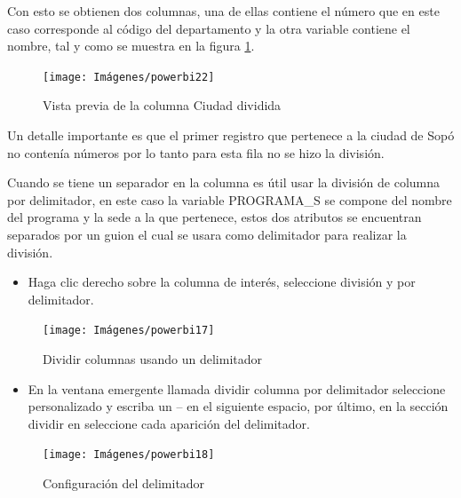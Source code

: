 \documentclass[
]{book}
\providecommand{\tightlist}{%
  \setlength{\itemsep}{0pt}\setlength{\parskip}{0pt}}
\begin{document}
Con esto se obtienen dos columnas, una de ellas contiene el número que en este caso corresponde al código del departamento y la otra variable contiene el nombre, tal y como se muestra en la figura \ref{fig:columnasdivididas-fig}.

\begin{figure}

{\centering \texttt{[image: Imágenes/powerbi22]} 

}

\caption{Vista previa de la columna Ciudad dividida}\label{fig:columnasdivididas-fig}
\end{figure}

Un detalle importante es que el primer registro que pertenece a la ciudad de Sopó no contenía números por lo tanto para esta fila no se hizo la división.

Cuando se tiene un separador en la columna es útil usar la división de columna por delimitador, en este caso la variable PROGRAMA\_S se compone del nombre del programa y la sede a la que pertenece, estos dos atributos se encuentran separados por un guion el cual se usara como delimitador para realizar la división.

\begin{itemize}
\tightlist
\item
  Haga clic derecho sobre la columna de interés, seleccione división y por delimitador.
\end{itemize}

\begin{figure}

{\centering \texttt{[image: Imágenes/powerbi17]} 

}

\caption{Dividir columnas usando un delimitador}\label{fig:columnasdivididasdelimitador-fig}
\end{figure}

\begin{itemize}
\tightlist
\item
  En la ventana emergente llamada dividir columna por delimitador seleccione personalizado y escriba un -- en el siguiente espacio, por último, en la sección dividir en seleccione cada aparición del delimitador.
\end{itemize}

\begin{figure}

{\centering \texttt{[image: Imágenes/powerbi18]} 

}

\caption{Configuración del delimitador}\label{fig:configuraciondeldelimitador-fig}
\end{figure}
\end{document}
